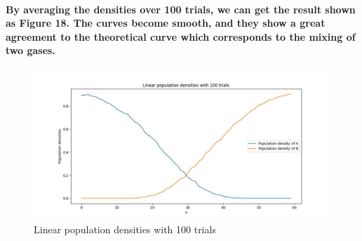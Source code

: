 \documentclass{article}
\begin{document}
\paragraph{
By averaging the densities over 100 trials, we can get the result shown as Figure 18. The curves become smooth, and they show a great agreement to the theoretical curve which corresponds to the mixing of two gases.
}
\begin{figure}[htbp]
    \centering
    \includegraphics[width=0.5\linewidth]{Part4_3.jpeg}
    \caption{Linear population densities with 100 trials}
\end{figure}
\end{document}

